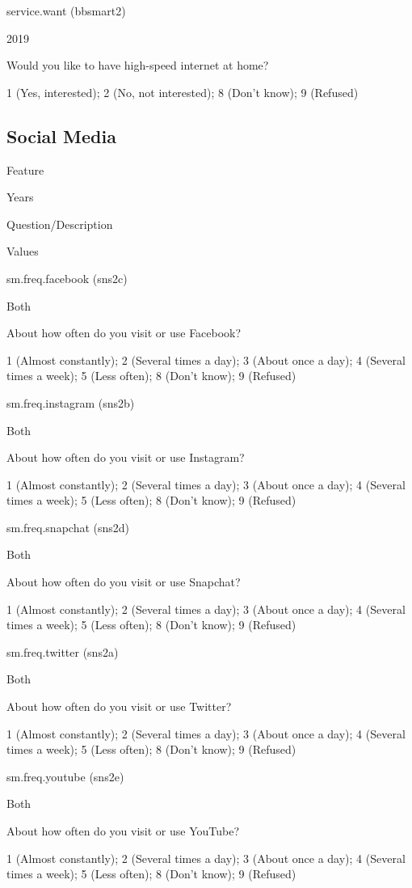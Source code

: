 \documentclass[]{book}
\begin{document}
service.want (bbsmart2)

2019

Would you like to have high-speed internet at home?

1 (Yes, interested); 2 (No, not interested); 8 (Don't know); 9 (Refused)

\subsection*{Social Media}\label{social-media}

Feature

Years

Question/Description

Values

sm.freq.facebook (sns2c)

Both

About how often do you visit or use Facebook?

1 (Almost constantly); 2 (Several times a day); 3 (About once a day); 4
(Several times a week); 5 (Less often); 8 (Don't know); 9 (Refused)

sm.freq.instagram (sns2b)

Both

About how often do you visit or use Instagram?

1 (Almost constantly); 2 (Several times a day); 3 (About once a day); 4
(Several times a week); 5 (Less often); 8 (Don't know); 9 (Refused)

sm.freq.snapchat (sns2d)

Both

About how often do you visit or use Snapchat?

1 (Almost constantly); 2 (Several times a day); 3 (About once a day); 4
(Several times a week); 5 (Less often); 8 (Don't know); 9 (Refused)

sm.freq.twitter (sns2a)

Both

About how often do you visit or use Twitter?

1 (Almost constantly); 2 (Several times a day); 3 (About once a day); 4
(Several times a week); 5 (Less often); 8 (Don't know); 9 (Refused)

sm.freq.youtube (sns2e)

Both

About how often do you visit or use YouTube?

1 (Almost constantly); 2 (Several times a day); 3 (About once a day); 4
(Several times a week); 5 (Less often); 8 (Don't know); 9 (Refused)
\end{document}
